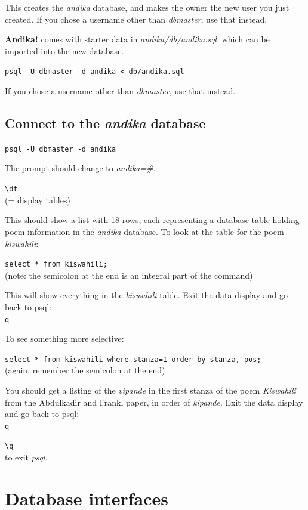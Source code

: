 This creates the \textit{andika} database, and makes the owner the new user you just created.  If you chose a username other than \textit{dbmaster}, use that instead.

\textbf{Andika!} comes with starter data in \textit{andika/db/andika.sql}, which can be imported into the new database.

\verb|psql -U dbmaster -d andika < db/andika.sql|

If you chose a username other than \textit{dbmaster}, use that instead.


\subsection{Connect to the \textit{andika} database}
\label{ss:connect}

\verb|psql -U dbmaster -d andika|

The prompt should change to \textit{andika=\#}. 

\verb|\dt|\\
(= display tables)

This should show a list with 18 rows, each representing a database table holding poem information in the \textit{andika} database.  To look at the table for the poem \textit{kiswahili}:

\verb|select * from kiswahili;|\\
(note: the semicolon at the end is an integral part of the command)

This will show everything in the \textit{kiswahili} table.  Exit the data display and go back to psql:\\
\verb|q|

To see something more selective:

\verb|select * from kiswahili where stanza=1 order by stanza, pos;|\\
(again, remember the semicolon at the end)

You should get a listing of the \textit{vipande} in the first stanza of the poem \textit{Kiswahili} from the Abdulkadir and Frankl paper, in order of \textit{kipande}.  Exit the data display and go back to psql:\\
\verb|q|

\verb|\q|\\
to exit \textit{psql}.


\section{Database interfaces}

